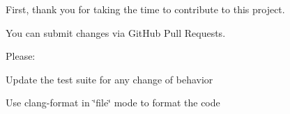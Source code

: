 First, thank you for taking the time to contribute to this project.

You can submit changes via Git\+Hub Pull Requests.

Please\+:


\begin{DoxyEnumerate}
\item Update the test suite for any change of behavior
\item Use clang-\/format in \char`\"{}file\char`\"{} mode to format the code 
\end{DoxyEnumerate}